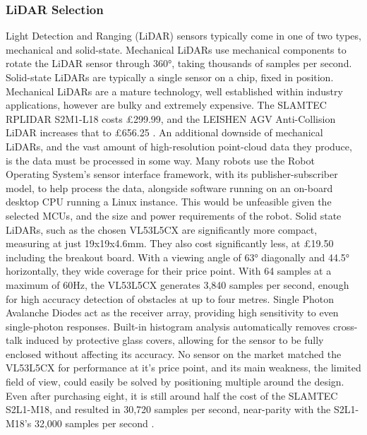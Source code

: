 \documentclass [12pt]{article}
\begin{document}
\subsubsection{LiDAR Selection}

Light Detection and Ranging (LiDAR) sensors typically come in one of two types, mechanical and solid-state. Mechanical LiDARs use mechanical components to rotate the LiDAR sensor through 360°, taking thousands of samples per second. Solid-state LiDARs are typically a single sensor on a chip, fixed in position. Mechanical LiDARs are a mature technology, well established within industry applications, however are bulky and extremely expensive. The SLAMTEC RPLIDAR S2M1-L18 costs £299.99, and the LEISHEN AGV Anti-Collision LiDAR increases that to £656.25 \cite{robotshoplidar}.
An additional downside of mechanical LiDARs, and the vast amount of high-resolution point-cloud data they produce, is the data must be processed in some way. Many robots use the Robot Operating System’s sensor interface framework, with its publisher-subscriber model, to help process the data, alongside software running on an on-board desktop CPU running a Linux instance. This would be unfeasible given the selected MCUs, and the size and power requirements of the robot.
Solid state LiDARs, such as the chosen VL53L5CX are significantly more compact, measuring at just 19x19x4.6mm. They also cost significantly less, at £19.50 including the breakout board. With a viewing angle of 63° diagonally and 44.5° horizontally, they wide coverage for their price point. With 64 samples at a maximum of 60Hz, the VL53L5CX generates 3,840 samples per second, enough for high accuracy detection of obstacles at up to four metres. Single Photon Avalanche Diodes act as the receiver array, providing high sensitivity to even single-photon responses. Built-in histogram analysis automatically removes cross-talk induced by protective glass covers, allowing for the sensor to be fully enclosed without affecting its accuracy. No sensor on the market matched the VL53L5CX for performance at it’s price point, and its main weakness, the limited field of view, could easily be solved by positioning multiple around the design. Even after purchasing eight, it is still around half the cost of the SLAMTEC S2L1-M18, and resulted in 30,720 samples per second, near-parity with the S2L1-M18’s 32,000 samples per second \cite{robotshopanticol}.
\end{document}
